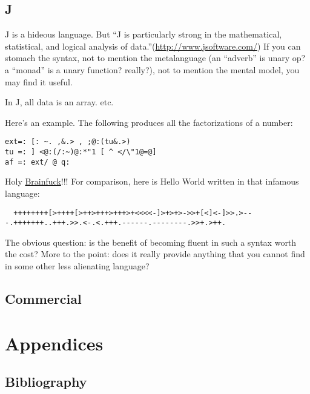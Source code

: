 \documentclass[reqno,12pt]{tufte-book}
\numberwithin{equation}{subsection}
\begin{document}
\chapter{J}

J is a hideous language.  But ``J is particularly strong in the
mathematical, statistical, and logical analysis of
data.''(\url{http://www.jsoftware.com/}) If you can stomach the
syntax, not to mention the metalanguage (an ``adverb'' is unary op? a
``monad'' is a unary function? really?), not to mention the mental
model, you may find it useful.

In J, all data is an array.  etc.

Here's an example.  The following produces all the factorizations of a
number:

\begin{verbatim}
ext=: [: ~. ,&.> , ;@:(tu&.>)
tu =: ] <@:(/:~)@:*"1 [ ^ </\"1@=@]
af =: ext/ @ q:
\end{verbatim}

Holy \href{http://www.muppetlabs.com/~breadbox/bf/}{Brainfuck}!!!  For comparison, here is Hello World
written in that infamous language:

\begin{verbatim}
  ++++++++[>++++[>++>+++>+++>+<<<<-]>+>+>->>+[<]<-]>>.>---.+++++++..+++.>>.<-.<.+++.------.--------.>>+.>++.
\end{verbatim}

The obvious question: is the benefit of becoming fluent in such a
syntax worth the cost?  More to the point: does it really provide
anything that you cannot find in some other less alienating language?

\chapter{Commercial}




\clearpage
\part{Appendices}
\appendix
\begin{appendices}
\chapter{Bibliography}


\end{appendices}
\end{document}

